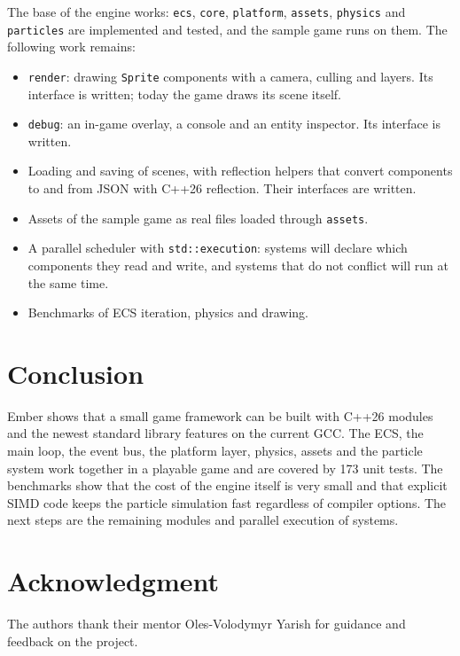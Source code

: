 \documentclass[conference]{IEEEtran}
\newcommand{\code}[1]{\texttt{#1}}
\begin{document}
The base of the engine works: \code{ecs}, \code{core}, \code{platform}, \code{assets},
\code{physics} and \code{particles} are implemented and tested, and the sample game runs
on them. The following work remains:
\begin{itemize}
    \item \code{render}: drawing \code{Sprite} components with a camera, culling and
          layers. Its interface is written; today the game draws its scene itself.
    \item \code{debug}: an in-game overlay, a console and an entity inspector. Its
          interface is written.
    \item Loading and saving of scenes, with reflection helpers that convert components
          to and from JSON with C++26 reflection. Their interfaces are written.
    \item Assets of the sample game as real files loaded through \code{assets}.
    \item A parallel scheduler with \code{std::execution}: systems will declare which
          components they read and write, and systems that do not conflict will run at
          the same time.
    \item Benchmarks of ECS iteration, physics and drawing.
\end{itemize}

\section{Conclusion}

Ember shows that a small game framework can be built with C++26 modules and the newest
standard library features on the current GCC. The ECS, the main loop, the event bus, the
platform layer, physics, assets and the particle system work together in a playable game
and are covered by 173 unit tests. The benchmarks show that the cost of the engine itself is very small and
that explicit SIMD code keeps the particle simulation fast regardless of compiler options.
The next steps are the remaining modules and parallel execution of systems.

\section*{Acknowledgment}

The authors thank their mentor Oles-Volodymyr Yarish for guidance and feedback on the
project.
\end{document}
